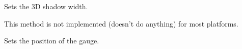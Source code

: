 \label{wxgaugesetshadowwidth}


Sets the 3D shadow width.


This method is not implemented (doesn't do anything) for most platforms.


\label{wxgaugesetvalue}


Sets the position of the gauge.






